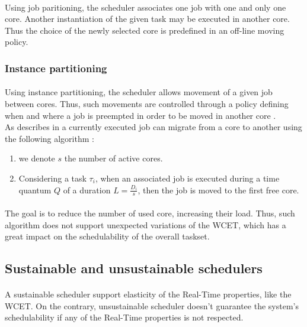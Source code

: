 \paragraph{}
Using job paritioning, the scheduler associates one job with one and only one core. Another
instantiation of the given task may be executed in another core. Thus the choice of the newly
selected core is predefined in an off-line moving policy.

\subsubsection{Instance partitioning}

\paragraph{}
Using instance partitioning, the scheduler allows movement of a given job between cores. Thus, such
movements are controlled through a policy defining when and where a job is preempted in order to be
moved in another core .\\
As describes in  a currently executed job can migrate from a core to another
using the following algorithm :\\
\begin{enumerate}
\item we denote $s$ the number of active cores.
\item Considering a task $\tau_{i}$, when an associated job is executed during a time quantum $Q$ of a
duration $L = \frac{D_i}{s}$, then the job is moved to the first free core.
\end{enumerate}

\paragraph{}
The goal is to reduce the number of used core, increasing their load. Thus, such algorithm does
not support unexpected variations of the WCET, which has a great impact on the schedulability of
the overall taskset.

\subsection{Sustainable and unsustainable schedulers}

\paragraph{}
A sustainable scheduler support elasticity of the Real-Time properties, like the WCET. On the
contrary, unsustainable scheduler doesn't guarantee the system's schedulability if any of the
Real-Time properties is not respected.

